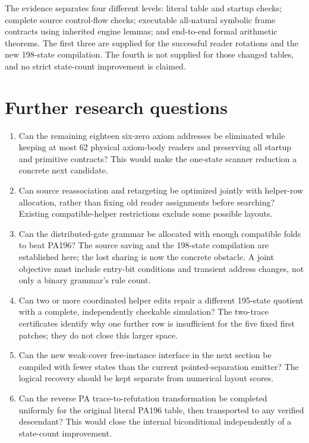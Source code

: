 The evidence separates four different levels: literal table and startup
checks; complete source control-flow checks; executable all-natural
symbolic frame contracts using inherited engine lemmas; and end-to-end
formal arithmetic theorems. The first three are supplied for the successful
reader rotations and the new 198-state compilation. The fourth is not supplied for those changed tables, and
no strict state-count improvement is claimed.

\section{Further research questions}

\begin{enumerate}
\item Can the remaining eighteen six-zero axiom addresses be eliminated
while keeping at most 62 physical axiom-body readers and preserving all
startup and primitive contracts? This would make the one-state scanner
reduction a concrete next candidate.
\item Can source reassociation and retargeting be optimized jointly with
helper-row allocation, rather than fixing old reader assignments before
searching? Existing compatible-helper restrictions exclude some possible
layouts.
\item Can the distributed-gate grammar be allocated with enough compatible
folds to beat PA196? The source saving and the 198-state compilation are
established here; the lost sharing is now the concrete obstacle. A joint
objective must include entry-bit conditions and transient address changes,
not only a binary grammar's rule count.
\item Can two or more coordinated helper edits repair a different
195-state quotient with a complete, independently checkable simulation?
The two-trace certificates identify why one further row is insufficient
for the five fixed first patches; they do not close this larger space.
\item Can the new weak-cover free-instance interface in the next section
be compiled with fewer states than the current pointed-separation emitter?
The logical recovery should be kept separate from numerical layout scores.
\item Can the reverse PA trace-to-refutation transformation be completed
uniformly for the original literal PA196 table, then transported to any
verified descendant? This would close the internal biconditional independently
of a state-count improvement.
\end{enumerate}

\appendix

